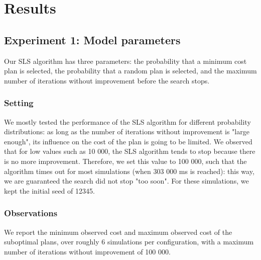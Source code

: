 \documentclass[10pt]{article}
\begin{document}
\section{Results}

\subsection{Experiment 1: Model parameters}
Our SLS algorithm has three parameters: the probability that a minimum cost plan is selected, the probability that a random plan is selected, and the maximum number of iterations without improvement before the search stops.

\subsubsection{Setting}
We mostly tested the performance of the SLS algorithm for different probability distributions: as long as the number of iterations without improvement is "large enough", its influence on the cost of the plan is going to be limited. We observed that for low values such as 10 000, the SLS algorithm tends to stop because there is no more improvement. Therefore, we set this value to 100 000, such that the algorithm times out for most simulations (when 303 000 ms is reached): this way, we are guaranteed the search did not stop "too soon".
For these simulations, we kept the initial seed of 12345.

\subsubsection{Observations}
We report the minimum observed cost and maximum observed cost of the suboptimal plans, over roughly 6 simulations per configuration, with a maximum number of iterations without improvement of 100 000.\\
\end{document}
